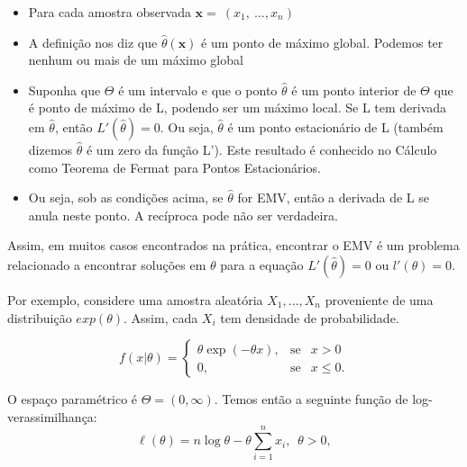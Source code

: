 \documentclass[
  letterpaper,
  DIV=11,
  numbers=noendperiod]{scrreprt}
\begin{document}
\begin{tcolorbox}[enhanced jigsaw, arc=.35mm, toptitle=1mm, coltitle=black, opacityback=0, opacitybacktitle=0.6, toprule=.15mm, colframe=quarto-callout-note-color-frame, titlerule=0mm, bottomtitle=1mm, breakable, colbacktitle=quarto-callout-note-color!10!white, rightrule=.15mm, leftrule=.75mm, colback=white, left=2mm, title=\textcolor{quarto-callout-note-color}{\faInfo}\hspace{0.5em}{Nota}, bottomrule=.15mm]

\begin{itemize}
\item
  Para cada amostra observada \(\textbf{x} = \ (x_1, \ \dots, x_n)\)
\item
  A definição nos diz que \(\hat{\theta}(\textbf{x})\) é um ponto de
  máximo global. Podemos ter nenhum ou mais de um máximo global
\item
  Suponha que \(\Theta\) é um intervalo e que o ponto \(\hat{\theta}\) é
  um ponto interior de \(\Theta\) que é ponto de máximo de L, podendo
  ser um máximo local. Se L tem derivada em \(\hat{\theta}\), então
  \(L'( \hat{\theta}) = 0\). Ou seja, \(\hat{\theta}\) é um ponto
  estacionário de L (também dizemos \(\hat{\theta}\) é um zero da função
  L'). Este resultado é conhecido no Cálculo como Teorema de Fermat para
  Pontos Estacionários.
\item
  Ou seja, sob as condições acima, se \(\hat{\theta}\) for EMV, então a
  derivada de L se anula neste ponto. A recíproca pode não ser
  verdadeira.
\end{itemize}

\end{tcolorbox}

Assim, em muitos casos encontrados na prática, encontrar o EMV é um
problema relacionado a encontrar soluções em \(\theta\) para a equação
\(L'(\hat{\theta}) = 0\) ou \(l'(\theta) = 0\).

Por exemplo, considere uma amostra aleatória \(X_1, \dots, X_n\)
proveniente de uma distribuição \(exp(\theta)\). Assim, cada \(X_i\) tem
densidade de probabilidade.

\[
    f(x|\theta) = \left\{
    \begin{matrix}
        \theta \exp(-\theta x), &  \mbox{se} & x>0\\
          0, &  \mbox{se} & x\leq 0. 
    \end{matrix}
         \right.
\]

O espaço paramétrico é \(\Theta = (0, \infty)\). Temos então a seguinte
função de log-verassimilhança: \[
\ell(\theta)= n \log \theta -\theta \sum_{i=1}^n x_i, \,\,\, \theta > 0, 
\]
\end{document}
